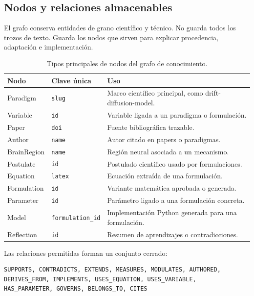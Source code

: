 \subsection{Nodos y relaciones almacenables}

El grafo conserva entidades de grano científico y técnico. No guarda todos los
trozos de texto. Guarda los nodos que sirven para explicar procedencia,
adaptación e implementación.

\begin{table}[H]
\begin{center}
\scriptsize
\begin{tabular}{|p{2.6cm}|p{2.6cm}|p{6.9cm}|} \hline
\textbf{Nodo} & \textbf{Clave única} & \textbf{Uso} \\ \hline
Paradigm & \texttt{slug} & Marco científico principal, como drift-diffusion-model. \\ \hline
Variable & \texttt{id} & Variable ligada a un paradigma o formulación. \\ \hline
Paper & \texttt{doi} & Fuente bibliográfica trazable. \\ \hline
Author & \texttt{name} & Autor citado en papers o paradigmas. \\ \hline
BrainRegion & \texttt{name} & Región neural asociada a un mecanismo. \\ \hline
Postulate & \texttt{id} & Postulado científico usado por formulaciones. \\ \hline
Equation & \texttt{latex} & Ecuación extraída de una formulación. \\ \hline
Formulation & \texttt{id} & Variante matemática aprobada o generada. \\ \hline
Parameter & \texttt{id} & Parámetro ligado a una formulación concreta. \\ \hline
Model & \texttt{formulation\_id} & Implementación Python generada para una formulación. \\ \hline
Reflection & \texttt{id} & Resumen de aprendizajes o contradicciones. \\ \hline
\end{tabular}
\caption{Tipos principales de nodos del grafo de conocimiento.}
\end{center}
\end{table}

Las relaciones permitidas forman un conjunto cerrado:

\begin{small}
\begin{verbatim}
SUPPORTS, CONTRADICTS, EXTENDS, MEASURES, MODULATES, AUTHORED,
DERIVES_FROM, IMPLEMENTS, USES_EQUATION, USES_VARIABLE,
HAS_PARAMETER, GOVERNS, BELONGS_TO, CITES
\end{verbatim}
\end{small}

